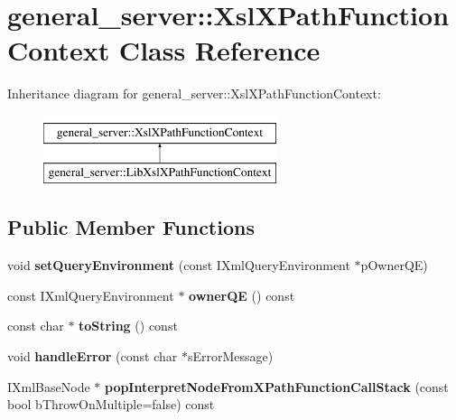 \hypertarget{classgeneral__server_1_1XslXPathFunctionContext}{\section{general\-\_\-server\-:\-:\-Xsl\-X\-Path\-Function\-Context \-Class \-Reference}
\label{classgeneral__server_1_1XslXPathFunctionContext}
}
\-Inheritance diagram for general\-\_\-server\-:\-:\-Xsl\-X\-Path\-Function\-Context\-:\begin{figure}[H]
\begin{center}
\leavevmode
\includegraphics[height=2.000000cm]{classgeneral__server_1_1XslXPathFunctionContext}
\end{center}
\end{figure}
\subsection*{\-Public \-Member \-Functions}
\begin{DoxyCompactItemize}
\item 
\hypertarget{classgeneral__server_1_1XslXPathFunctionContext_a517a6b7134b07fbc2aa53dab26eb181d}{void {\bfseries set\-Query\-Environment} (const \-I\-Xml\-Query\-Environment $\ast$p\-Owner\-Q\-E)}\label{classgeneral__server_1_1XslXPathFunctionContext_a517a6b7134b07fbc2aa53dab26eb181d}

\item 
\hypertarget{classgeneral__server_1_1XslXPathFunctionContext_a858c4dc32a3f2c85fa3fadba0a0b9c02}{const \-I\-Xml\-Query\-Environment $\ast$ {\bfseries owner\-Q\-E} () const }\label{classgeneral__server_1_1XslXPathFunctionContext_a858c4dc32a3f2c85fa3fadba0a0b9c02}

\item 
\hypertarget{classgeneral__server_1_1XslXPathFunctionContext_a7d31668a51ca94f109523914c8b6a721}{const char $\ast$ {\bfseries to\-String} () const }\label{classgeneral__server_1_1XslXPathFunctionContext_a7d31668a51ca94f109523914c8b6a721}

\item 
\hypertarget{classgeneral__server_1_1XslXPathFunctionContext_a61d60501c15dd37e58c62b0a3523d750}{void {\bfseries handle\-Error} (const char $\ast$s\-Error\-Message)}\label{classgeneral__server_1_1XslXPathFunctionContext_a61d60501c15dd37e58c62b0a3523d750}

\item 
\hypertarget{classgeneral__server_1_1XslXPathFunctionContext_ac30c920a80dc5bd9b07cd925a0b036ad}{\-I\-Xml\-Base\-Node $\ast$ {\bfseries pop\-Interpret\-Node\-From\-X\-Path\-Function\-Call\-Stack} (const bool b\-Throw\-On\-Multiple=false) const }\label{classgeneral__server_1_1XslXPathFunctionContext_ac30c920a80dc5bd9b07cd925a0b036ad}

\end{DoxyCompactItemize}
